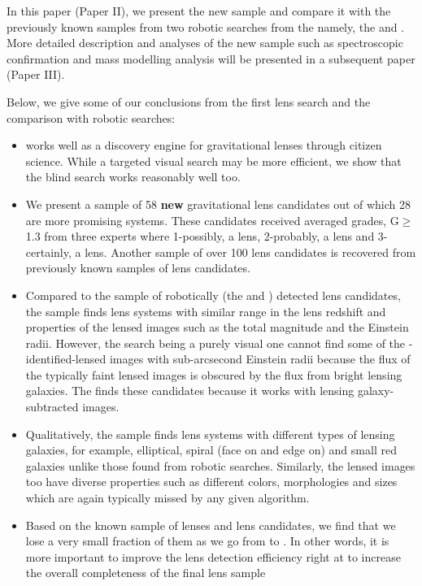 \documentclass[useAMS,usenatbib,a4paper]{mn2e}
\begin{document}
In this paper (Paper II), we present the new \sw sample and compare it
with the previously known samples from two robotic searches from the
\cfhtls namely, the \rf and \af. More detailed description and analyses
of the new sample such as spectroscopic confirmation and mass modelling
analysis will be presented in a subsequent \sw paper (Paper III). 

Below, we give some of our conclusions from the first \sw lens search
and the comparison with robotic searches:
\begin{itemize}

\item \sw works well as a discovery engine for gravitational lenses
through citizen science. While a targeted visual search may be more
efficient, we show that the blind search works reasonably well too.

\item We present a sample of 58 {\bf new} gravitational lens candidates
out of which 28 are more promising systems. These candidates received
averaged grades, G$\ge$1.3 from three experts where 1-possibly, a lens,
2-probably, a lens and 3-certainly, a lens. Another sample of over 100
lens candidates is recovered from previously known samples of lens
candidates.

\item Compared to the sample of robotically (the \rf and \af) detected
lens candidates, the \sw sample finds lens systems with similar range in
the lens redshift and properties of the lensed images such as the total
magnitude and the Einstein radii. However, the \sw search being a purely
visual one cannot find some of the \rf-identified-lensed images with
sub-arcsecond Einstein radii because the flux of the typically faint
lensed images is obscured by the flux from bright lensing galaxies. The
\rf finds these candidates because it works with lensing
galaxy-subtracted images.

\item Qualitatively, the \sw sample finds lens systems with different
types of lensing galaxies, for example, elliptical, spiral (face on and
edge on) and small red galaxies unlike those found from robotic
searches. Similarly, the lensed images too have diverse properties such
as different colors, morphologies and sizes which are again typically
missed by any given algorithm.

\item Based on the known sample of lenses and lens candidates, we find
that we lose a very small fraction of them as we go from \StageOne to
\StageTwo. In other words, it is more important to improve the lens
detection efficiency right at \StageOne to increase the overall
completeness of the final lens sample


\end{itemize}
\end{document}
